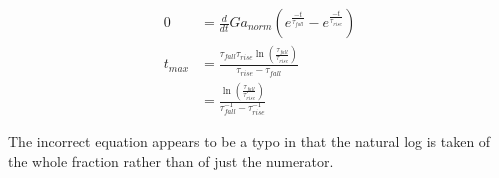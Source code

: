 %
%
%
\begin{align*}
0&=\frac{d}{dt} Ga_{norm} (e^{\frac{-t}{\tau_{fall}}} - e^{\frac{-t}{\tau_{rise}}})\\
t_{max} &= \frac{ \tau_{fall}\tau_{rise}\ln(\frac{\tau_{fall}}{\tau_{rise}})  }{ \tau_{rise} - \tau_{fall}  } \\
        &= \frac{ \ln(\frac{\tau_{fall}}{\tau_{rise}})  }{ \tau_{fall}^{-1} - \tau_{rise}^{-1}  } 
\end{align*}

The incorrect equation appears to be a typo in that the natural log is taken of the whole fraction rather than of just the numerator.
%
